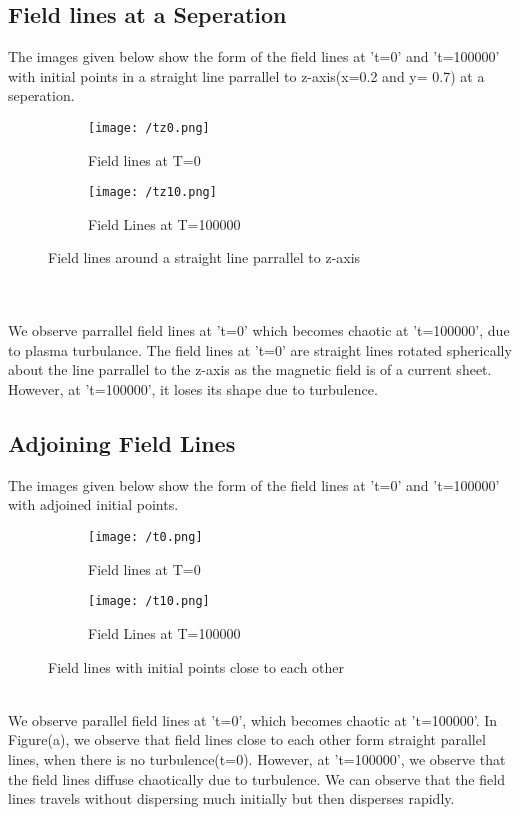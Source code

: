 \documentclass[fleqn]{report}
\begin{document}
	\subsection{Field lines at a Seperation}
	The images given below show the form of the field lines at 't=0' and 't=100000' with initial points in a straight line parrallel to z-axis(x=0.2 and y= 0.7) at a seperation.
	\begin{figure}[!ht]
		\centering
		\begin{subfigure}{.5\textwidth}
			\centering
			\texttt{[image: /tz0.png]}
		\caption{Field lines at T=0}
		\label{fig:tz0}
	\end{subfigure}%
	\begin{subfigure}{.5\textwidth}
		\centering
		\texttt{[image: /tz10.png]}
		\caption{Field Lines at T=100000}
		\label{fig:tz10}
	\end{subfigure}
	\caption{Field lines around a straight line parrallel to z-axis}
	\label{fig:tz}
	\end{figure}\\\\
	We observe parrallel field lines at 't=0' which becomes chaotic at 't=100000', due to plasma turbulance.
	The field lines at 't=0' are straight lines rotated spherically about the line parrallel to the z-axis as the magnetic field is of a current sheet. However, at 't=100000', it loses its shape due to turbulence.\\ 
	\subsection{Adjoining Field Lines}
	The images given below show the form of the field lines at 't=0' and 't=100000' with adjoined initial points.
	\begin{figure}[!ht]
		\centering
		\begin{subfigure}{.5\textwidth}
			\centering
			\texttt{[image: /t0.png]}
			\caption{Field lines at T=0}
			\label{fig:sub1}
		\end{subfigure}%
		\begin{subfigure}{.5\textwidth}
			\centering
			\texttt{[image: /t10.png]}
			\caption{Field Lines at T=100000}
			\label{fig:sub2}
		\end{subfigure}
		\caption{Field lines with initial points close to each other}
		\label{fig:test}
	\end{figure} \\
	We observe parallel field lines at 't=0', which becomes chaotic at 't=100000'. In Figure(a), we observe that field lines close to each other form straight parallel lines, when there is no turbulence(t=0). However, at 't=100000', we observe that the field lines diffuse chaotically due to turbulence. We can observe that the field lines travels without dispersing much initially but then disperses rapidly.\
\end{document}
